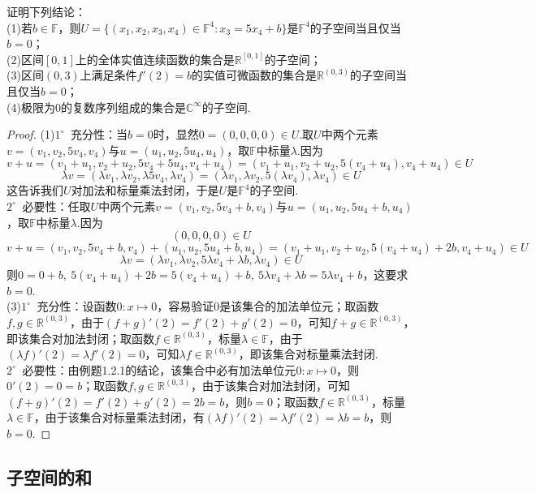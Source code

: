 \documentclass[lang=cn, zihao=5]{elegantbook}
\newcommand{\R}{\mathbb{R}}
\newcommand{\C}{\mathbb{C}}
\newcommand{\F}{\mathbb{F}}
\newcommand{\buzhou}[1]{$#1^{\circ} \ $}
\begin{document}
\begin{example}
    证明下列结论：\\
    (1)若$b \in \F$，则$U = \{ (x_1,x_2,x_3,x_4) \in \F ^{4} : x_3 = 5x_4+b \}$是$\F ^{4}$的子空间当且仅当$b=0$； \\
    (2)区间$[0,1]$上的全体实值连续函数的集合是$\R ^{[0,1]}$的子空间； \\
    (3)区间$(0,3)$上满足条件$f'(2)=b$的实值可微函数的集合是$\R ^{(0,3)}$的子空间当且仅当$b=0$； \\
    (4)极限为$0$的复数序列组成的集合是$\C ^{\infty}$的子空间.
\end{example}
\begin{proof}
	(1)\buzhou{1} 充分性：当$b=0$时，显然$0=(0,0,0,0) \in U$.取$U$中两个元素$v=(v_1,v_2,5v_4,v_4)$与$u=(u_1,u_2,5u_4,u_4)$，取$\F$中标量$\lambda$.因为
	$$v+u = (v_1+u_1,v_2+u_2,5v_4+5u_4,v_4+u_4) = (v_1+u_1,v_2+u_2,5(v_4+u_4),v_4+u_4) \in U$$
	$$\lambda v = (\lambda v_1,\lambda v_2,\lambda 5v_4,\lambda v_4) = (\lambda v_1,\lambda v_2,5(\lambda v_4),\lambda v_4) \in U$$
	这告诉我们$U$对加法和标量乘法封闭，于是$U$是$\F ^{4}$的子空间. \\
	\buzhou{2} 必要性：任取$U$中两个元素$v=(v_1,v_2,5v_4+b,v_4)$与$u=(u_1,u_2,5u_4+b,u_4)$，取$\F$中标量$\lambda$.因为
	$$(0,0,0,0) \in U$$
	$$v+u = (v_1,v_2,5v_4+b,v_4) + (u_1,u_2,5u_4+b,u_4) = (v_1+u_1, v_2+u_2, 5(v_4+u_4)+2b, v_4+u_4) \in U$$
	$$\lambda v = (\lambda v_1, \lambda v_2 , 5\lambda v_4 + \lambda b ,\lambda v_4) \in U$$
	则$0=0+b,~ 5(v_4+u_4)+2b = 5(v_4+u_4)+b,~ 5\lambda v_4 + \lambda b = 5\lambda v_4 + b$，这要求$b=0$. \\
	(3)\buzhou{1} 充分性：设函数$0:x \mapsto 0$，容易验证$0$是该集合的加法单位元；取函数$f,g \in \R ^{(0,3)}$，由于$(f+g)'(2)=f'(2)+g'(2)=0$，可知$f+g \in \R ^{(0,3)}$，即该集合对加法封闭；取函数$f \in \R ^{(0,3)}$，标量$\lambda \in \F$，由于$(\lambda f)'(2) = \lambda f'(2) = 0$，可知$\lambda f \in \R ^{(0,3)}$，即该集合对标量乘法封闭. \\
	\buzhou{2} 必要性：由例题1.2.1的结论，该集合中必有加法单位元$0:x \mapsto 0$，则$0'(2)=0=b$；取函数$f,g \in \R ^{(0,3)}$，由于该集合对加法封闭，可知$(f+g)'(2)=f'(2)+g'(2)=2b=b$，则$b=0$；取函数$f \in \R ^{(0,3)}$，标量$\lambda \in \F$，由于该集合对标量乘法封闭，有$(\lambda f)'(2) = \lambda f'(2) = \lambda b = b$，则$b=0$.
\end{proof}

\subsection{子空间的和}
\end{document}
